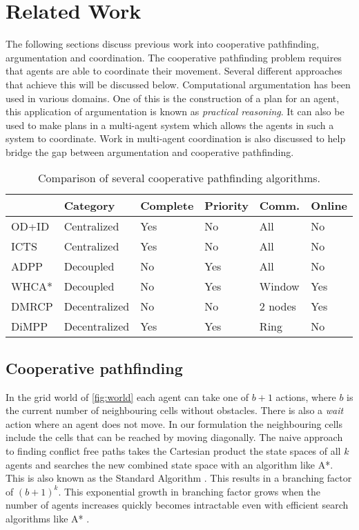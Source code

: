 \section{Related Work}\label{sec:related}
The following sections discuss previous work into cooperative pathfinding,
argumentation and coordination. The cooperative pathfinding problem requires
that agents are able to coordinate their movement. Several different approaches
that achieve this will be discussed below. Computational argumentation has been
used in various domains. One of this is the construction of a plan for an agent,
this application of argumentation is known as \emph{practical reasoning}. It
can also be used to make plans in a multi-agent system which allows the agents
in such a system to coordinate. Work in multi-agent coordination is also
discussed to help bridge the gap between argumentation and cooperative
pathfinding.

\begin{table*}[h]
    \centering
    \caption{Comparison of several cooperative pathfinding algorithms.}
    \label{tbl:planning-overview}
    \begin{tabular}{l|l|l|l|l|l}
        & Category & Complete & Priority & Comm. & Online \\
        \hline
        OD+ID \citep{standley2010,standley2011} & Centralized & Yes & No & All &
        No \\
        ICTS \citep{sharon2013} & Centralized & Yes & No & All & No \\
        ADPP \citep{cap2012} & Decoupled & No & Yes & All & No \\
        WHCA* \citep{silver2005} & Decoupled & No & Yes & Window
        & Yes \\
		DMRCP \citep{wei2016} & Decentralized & No & No & 2 nodes & Yes \\
        DiMPP \citep{chouhan2017} & Decentralized & Yes & Yes & Ring & No \\
    \end{tabular}
\end{table*}

\subsection{Cooperative pathfinding}
In the grid world of \autoref{fig:world} each agent can take one of $b+1$
actions, where $b$ is the current number of neighbouring cells without
obstacles. There is also a \textit{wait} action where an agent does not move.
In our formulation the neighbouring cells include the cells that can be reached
by moving diagonally. The naive approach to finding conflict free paths takes
the Cartesian product the state spaces of all $k$ agents and searches the new
combined state space with an algorithm like A*. This is also known as the
Standard Algorithm \citep{standley2010}. This results in a branching factor of
$(b+1)^k$. This exponential growth in branching factor grows when the number of
agents increases quickly becomes intractable even with efficient search
algorithms like A* \citep{sharon2013}.

